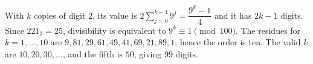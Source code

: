 With $k$ copies of digit $2$, its value is $2\sum_{j=0}^{k-1}9^j=\dfrac{9^k-1}{4}$ and it has $2k-1$ digits. Since $221_3=25$, divisibility is equivalent to $9^k\equiv1\pmod{100}$. The residues for $k=1,\ldots,10$ are $9,81,29,61,49,41,69,21,89,1$; hence the order is ten. The valid $k$ are $10,20,30,\ldots$, and the fifth is $50$, giving $\boxed{99}$ digits.
